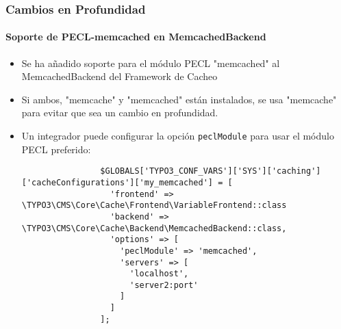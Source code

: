 \begin{frame}[fragile]
	\frametitle{Cambios en Profundidad}
	\framesubtitle{Soporte de PECL-memcached en MemcachedBackend}

	\lstset{basicstyle=\tiny\ttfamily}

	\begin{itemize}

		\item Se ha añadido soporte para el módulo PECL "memcached" al
			MemcachedBackend del Framework de Cacheo

		\item Si ambos, "memcache" y "memcached" están instalados, se usa "memcache" para evitar que sea un cambio en profundidad.

		\item Un integrador puede configurar la opción \texttt{peclModule} para usar el
			módulo PECL preferido:

			\begin{lstlisting}
				$GLOBALS['TYPO3_CONF_VARS']['SYS']['caching']['cacheConfigurations']['my_memcached'] = [
				  'frontend' => \TYPO3\CMS\Core\Cache\Frontend\VariableFrontend::class
				  'backend' => \TYPO3\CMS\Core\Cache\Backend\MemcachedBackend::class,
				  'options' => [
				    'peclModule' => 'memcached',
				    'servers' => [
				      'localhost',
				      'server2:port'
				    ]
				  ]
				];
			\end{lstlisting}

	\end{itemize}

\end{frame}


